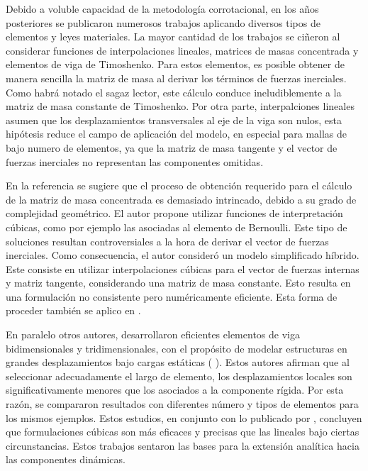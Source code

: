 Debido a voluble capacidad de la metodología corrotacional, en los años posteriores se publicaron numerosos trabajos aplicando diversos tipos de elementos y leyes materiales. La mayor cantidad de los trabajos se ciñeron al considerar funciones de interpolaciones lineales, matrices de masas concentrada y  elementos de viga de Timoshenko. Para estos elementos, es posible obtener de manera sencilla la matriz de masa al derivar los términos de fuerzas inerciales. Como habrá notado el sagaz lector, este cálculo conduce ineludiblemente a la matriz de masa constante de Timoshenko. 
Por otra parte, interpalciones lineales asumen que los desplazamientos transversales al eje de la viga son nulos, esta hipótesis reduce el campo de aplicación del modelo, en especial para mallas de bajo numero de elementos, ya que la matriz de masa tangente y el vector de fuerzas inerciales no representan las componentes omitidas. 

En la referencia \cite{Crisfield} se sugiere que el proceso de obtención requerido para el cálculo de la matriz de masa concentrada es demasiado intrincado, debido a su grado de complejidad geométrico. El autor propone utilizar funciones de interpretación cúbicas, como por ejemplo las asociadas al elemento de Bernoulli. Este tipo de soluciones resultan controversiales a la hora de derivar el vector de fuerzas inerciales. Como consecuencia, el autor consideró un modelo simplificado híbrido. Este consiste en utilizar interpolaciones cúbicas para el vector de fuerzas internas y matriz tangente, considerando una matriz de masa constante. Esto resulta en una formulación no consistente pero numéricamente eficiente.  Esta forma de proceder también se aplico en \cite{pacoste1997beam}.

En paralelo otros autores, desarrollaron eficientes elementos de viga bidimensionales y tridimensionales, con el propósito de modelar estructuras en grandes desplazamientos bajo cargas estáticas (\cite{Battini2002} \cite{alsafadie2010corotational}).
Estos autores afirman que al seleccionar adecuadamente el largo de elemento, los desplazamientos locales son significativamente menores que los asociados a la componente rígida. Por esta razón, se compararon resultados con diferentes número y tipos de elementos para los mismos ejemplos. Estos estudios, en conjunto con lo publicado por \cite{alsafadie2010corotational}, concluyen que formulaciones cúbicas son más eficaces y precisas que las lineales bajo ciertas circunstancias. Estos trabajos sentaron las bases para la extensión analítica hacia las componentes dinámicas.

